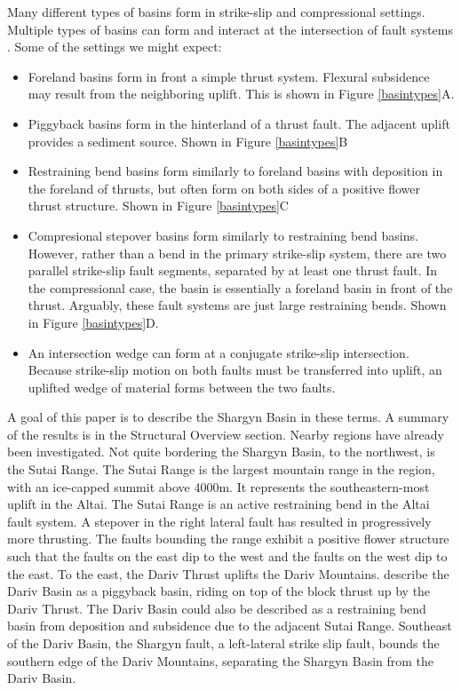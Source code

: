 Many different types of basins form in strike-slip and compressional settings. Multiple types of basins can form and interact at the intersection of fault systems \citep{Busby1995}. Some of the settings we might expect:
\begin{itemize}
	\item Foreland basins form in front a simple thrust system. Flexural subsidence may result from the neighboring uplift. This is shown in Figure \ref{basintypes}A. 
	\item Piggyback basins form in the hinterland of a thrust fault. The adjacent uplift provides a sediment source. Shown in Figure \ref{basintypes}B
	\item Restraining bend basins form similarly to foreland basins with deposition in the foreland of thrusts, but often form on both sides of a positive flower thrust structure. Shown in Figure \ref{basintypes}C
	\item Compresional stepover basins form similarly to restraining bend basins. However, rather than a bend in the primary strike-slip system, there are two parallel strike-slip fault segments, separated by at least one thrust fault. In the compressional case, the basin is essentially a foreland basin in front of the thrust. Arguably, these fault systems are just large restraining bends. Shown in Figure \ref{basintypes}D.
	\item An intersection wedge can form at a conjugate strike-slip intersection. Because strike-slip motion on both faults must be transferred into uplift, an uplifted wedge of material forms between the two faults. 
\end{itemize}

	A goal of this paper is to describe the Shargyn Basin in these terms. A summary of the results is in the Structural Overview section. Nearby regions have already been investigated. Not quite bordering the Shargyn Basin, to the northwest, is the Sutai Range. The Sutai Range is the largest mountain range in the region, with an ice-capped summit above 4000m. It represents the southeastern-most uplift in the Altai. The Sutai Range is an active restraining bend in the Altai fault system\citep{Cunningham2003}\citep{Howard2006}. A stepover in the right lateral fault has resulted in progressively more thrusting. The faults bounding the range exhibit a positive flower structure such that the faults on the east dip to the west and the faults on the west dip to the east\citep{Cunningham2003}. To the east, the Dariv Thrust uplifts the Dariv Mountains. \citet{Howard2006} describe the Dariv Basin as a piggyback basin, riding on top of the block thrust up by the Dariv Thrust. The Dariv Basin could also be described as a restraining bend basin from deposition and subsidence due to the adjacent Sutai Range. Southeast of the Dariv Basin, the Shargyn fault, a left-lateral strike slip fault, bounds the southern edge of the Dariv Mountains, separating the Shargyn Basin from the Dariv Basin.


